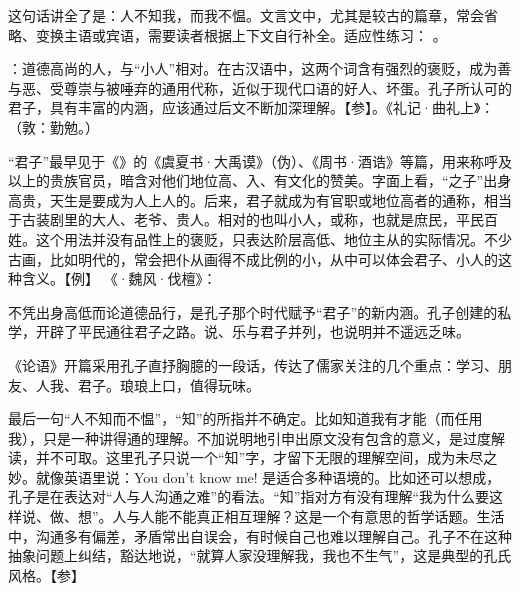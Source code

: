 {这句话讲全了是：人不知我，而我不愠。文言文中，尤其是较古的篇章，常会省略、变换主语或宾语，需要读者根据上下文自行补全。适应性练习：   。

\item {}：道德高尚的人，与“小人”相对。在古汉语中，这两个词含有强烈的褒贬，成为善与恶、受尊崇与被唾弃的通用代称，近似于现代口语的好人、坏蛋。孔子所认可的君子，具有丰富的内涵，应该通过后文不断加深理解。【参】。《礼记·曲礼上》：（敦：勤勉。）

“君子”最早见于《》的《虞夏书·大禹谟》（伪）、《周书·酒诰》等篇，用来称呼及以上的贵族官员，暗含对他们地位高、入、有文化的赞美。字面上看，“之子”出身高贵，天生是要成为人上人的。后来，君子就成为有官职或地位高者的通称，相当于古装剧里的大人、老爷、贵人。相对的也叫小人，或称，也就是庶民，平民百姓。这个用法并没有品性上的褒贬，只表达阶层高低、地位主从的实际情况。不少古画，比如明代的，常会把仆从画得不成比例的小，从中可以体会君子、小人的这种含义。【例】 《·魏风·伐檀》：

不凭出身高低而论道德品行，是孔子那个时代赋予“君子”的新内涵。孔子创建的私学，开辟了平民通往君子之路。说、乐与君子并列，也说明并不遥远乏味。
}
{
《论语》开篇采用孔子直抒胸臆的一段话，传达了儒家关注的几个重点：学习、朋友、人我、君子。琅琅上口，值得玩味。

最后一句“人不知而不愠”，“知”的所指并不确定。比如知道我有才能（而任用我），只是一种讲得通的理解。不加说明地引申出原文没有包含的意义，是过度解读，并不可取。这里孔子只说一个“知”字，才留下无限的理解空间，成为未尽之妙。就像英语里说：You don't know me! 是适合多种语境的。比如还可以想成，孔子是在表达对“人与人沟通之难”的看法。“知”指对方有没有理解“我为什么要这样说、做、想”。人与人能不能真正相互理解？这是一个有意思的哲学话题。生活中，沟通多有偏差，矛盾常出自误会，有时候自己也难以理解自己。孔子不在这种抽象问题上纠结，豁达地说，“就算人家没理解我，我也不生气”，这是典型的孔氏风格。【参】 
}

